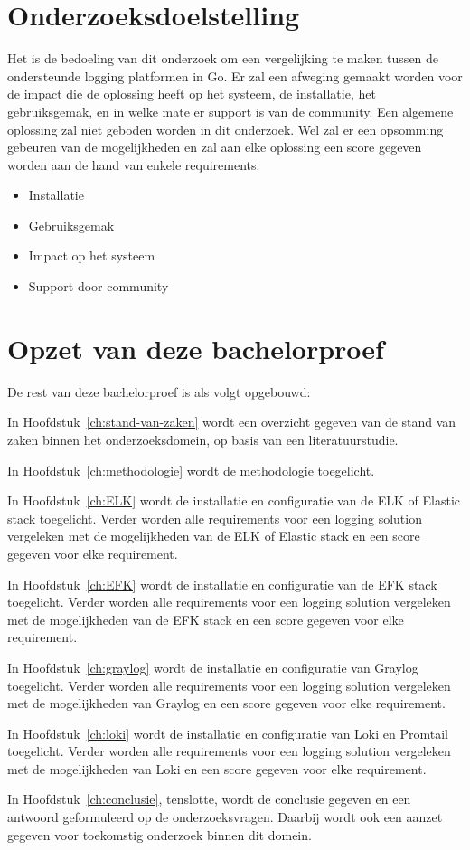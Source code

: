 \section{Onderzoeksdoelstelling}
\label{sec:onderzoeksdoelstelling}

Het is de bedoeling van dit onderzoek om een vergelijking te maken tussen de ondersteunde logging platformen in Go. Er zal een afweging gemaakt worden voor de impact die de oplossing heeft op het systeem, de installatie, het gebruiksgemak, en in welke mate er support is van de community. Een algemene oplossing zal niet geboden worden in dit onderzoek. Wel zal er een opsomming gebeuren van de mogelijkheden en zal aan elke oplossing een score gegeven worden aan de hand van enkele requirements.

\begin{itemize}
    \item Installatie 
    \item Gebruiksgemak
    \item Impact op het systeem
    \item Support door community
\end{itemize}

\section{Opzet van deze bachelorproef}
\label{sec:opzet-bachelorproef}

De rest van deze bachelorproef is als volgt opgebouwd:

In Hoofdstuk~\ref{ch:stand-van-zaken} wordt een overzicht gegeven van de stand van zaken binnen het onderzoeksdomein, op basis van een literatuurstudie.

In Hoofdstuk~\ref{ch:methodologie} wordt de methodologie toegelicht. 

In Hoofdstuk~\ref{ch:ELK} wordt de installatie en configuratie van de ELK of Elastic stack toegelicht. Verder worden alle requirements voor een logging solution vergeleken met de mogelijkheden van de ELK of Elastic stack en een score gegeven voor elke requirement.

In Hoofdstuk~\ref{ch:EFK} wordt de installatie en configuratie van de EFK stack toegelicht. Verder worden alle requirements voor een logging solution vergeleken met de mogelijkheden van de EFK stack en een score gegeven voor elke requirement.

In Hoofdstuk~\ref{ch:graylog} wordt de installatie en configuratie van Graylog toegelicht. Verder worden alle requirements voor een logging solution vergeleken met de mogelijkheden van Graylog en een score gegeven voor elke requirement.

In Hoofdstuk~\ref{ch:loki} wordt de installatie en configuratie van Loki en Promtail toegelicht. Verder worden alle requirements voor een logging solution vergeleken met de mogelijkheden van Loki en een score gegeven voor elke requirement.

In Hoofdstuk~\ref{ch:conclusie}, tenslotte, wordt de conclusie gegeven en een antwoord geformuleerd op de onderzoeksvragen. Daarbij wordt ook een aanzet gegeven voor toekomstig onderzoek binnen dit domein.

